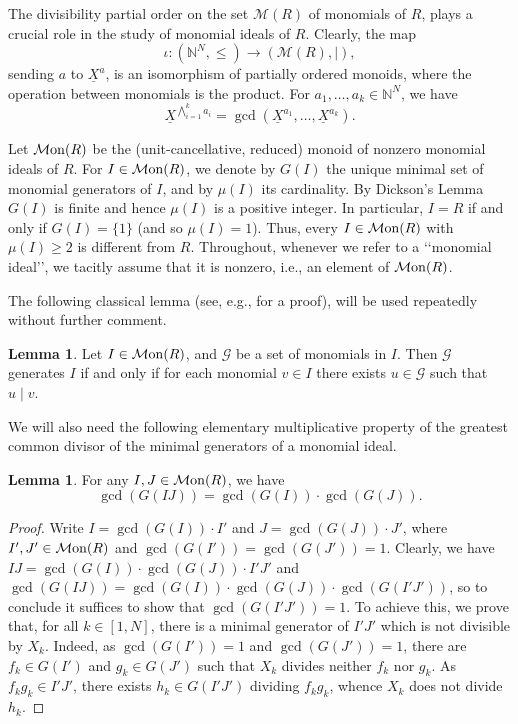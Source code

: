 \documentclass[a4paper,10pt,reqno]{amsart}
\theoremstyle{definition}
\newtheorem{lemma}[theorem]{Lemma}
\theoremstyle{definition}
\providecommand\Mon{{\mathcal{M}{\rm on}}}
\begin{document}
The divisibility partial order on the set $\mathcal M(R)$ of monomials of $R$, plays a crucial role in the study of monomial ideals of $R$. Clearly, the map \[\iota\colon (\mathbb N^N,\le) \to (\mathcal M(R),\vert),\] 
sending $a$ to $\underline X^a$, is an isomorphism of partially ordered monoids, where the operation between monomials is the product. For $a_1,\dots, a_k\in\mathbb N^N$,
we have
\[ \underline X^{\bigwedge_{i=1}^k a_i} = \gcd{(\underline X^{a_1}, \dots, \underline X^{a_k})}.  \]

\medskip

Let $\Mon(R)$ be the (unit-cancellative, reduced) monoid of nonzero monomial ideals of $R$. For $I\in\Mon(R)$, we denote by $G(I)$ the unique minimal set of monomial generators of $I$, and by $\mu(I)$ its cardinality. By Dickson's Lemma $G(I)$ is finite and hence $\mu(I)$ is a positive integer. In particular, $I=R$ if and only if $G(I)=\{1\}$ (and so $\mu(I)=1$). Thus, every $I\in \Mon(R)$ with $\mu(I)\ge 2$ is different from $R$. Throughout, whenever we refer to a \lq\lq monomial ideal\rq\rq, we tacitly assume that it is nonzero, i.e., an element of $\Mon(R)$.

The following classical lemma (see, e.g., \cite[Cor.~1.8]{En-Her} for a proof), will be used repeatedly without further comment.
\begin{lemma}\label{lem: mon_gen}
Let $I\in\Mon(R)$, and $\mathcal G$ be a set of monomials in $I$. Then $\mathcal G$ generates $I$ if and only if for each monomial $v\in I$ there exists $u\in\mathcal G$ such that $u\mid v$.
\end{lemma}

We will also need the following elementary multiplicative property of the greatest common divisor of the minimal generators of a monomial ideal.
\begin{lemma}\label{lem: gcd IJ}
    For any $I,J\in\Mon(R)$, we have
    \[ \gcd(G(IJ)) = \gcd(G(I))\cdot\gcd(G(J)). \]
\end{lemma}
\begin{proof}
    Write $I=\gcd(G(I))\cdot I'$ and $J=\gcd(G(J))\cdot J'$, where $I',J'\in\Mon(R)$ and $\gcd(G(I'))=\gcd(G(J'))=1$. Clearly, we have $IJ = \gcd(G(I))\cdot \gcd(G(J))\cdot I'J'$ and $\gcd(G(IJ)) = \gcd(G(I))\cdot \gcd(G(J))\cdot \gcd(G(I'J'))$, so to conclude it suffices to show that $\gcd(G(I'J'))=1$. To achieve this, we prove that, for all $k\in [1,N]$, there is a minimal generator of $I'J'$ which is not divisible by $X_k$. Indeed, as $\gcd(G(I'))=1$ and $\gcd(G(J'))=1$, there are $f_k\in G(I')$ and $g_k\in G(J')$ such that $X_k$ divides neither $f_k$ nor $g_k$. As $f_kg_k\in I'J'$, there exists $h_k\in G(I'J')$ dividing $f_kg_k$, whence $X_k$ does not divide $h_k$.
\end{proof}
\end{document}
